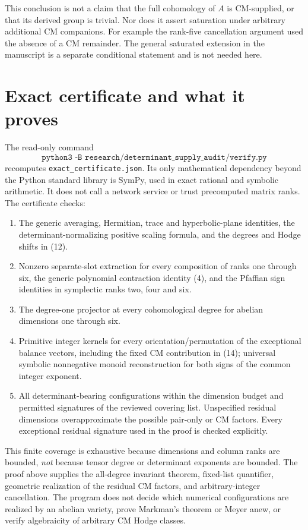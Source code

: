 \documentclass[11pt]{article}
\theoremstyle{remark}
\begin{document}
This conclusion is not a claim that the full cohomology of $A$ is
CM-supplied, or that its derived group is trivial. Nor does it assert
saturation under arbitrary additional CM companions. For example the
rank-five cancellation argument used the absence of a CM remainder.
The general saturated extension in the manuscript is a separate
conditional statement and is not needed here.

\section{Exact certificate and what it proves}

The read-only command
\[
 \texttt{python3 -B research/determinant\_supply\_audit/verify.py}
\]
recomputes \texttt{exact\_certificate.json}. Its only mathematical
dependency beyond the Python standard library is SymPy, used in exact
rational and symbolic arithmetic.
It does not call a network service or trust precomputed matrix ranks.
The certificate checks:
\begin{enumerate}
\item The generic averaging, Hermitian, trace and hyperbolic-plane
identities, the determinant-normalizing positive scaling formula,
and the degrees and Hodge shifts in (12).
\item Nonzero separate-slot extraction for every composition of ranks
one through six, the generic polynomial contraction identity (4),
and the Pfaffian sign identities in symplectic ranks two, four and six.
\item The degree-one projector at every cohomological degree for
abelian dimensions one through six.
\item Primitive integer kernels for every orientation/permutation of
the exceptional balance vectors, including the fixed CM contribution
in (14); universal symbolic nonnegative monoid reconstruction for
both signs of the common integer exponent.
\item All determinant-bearing configurations within the dimension
budget and permitted signatures of the reviewed covering list.
Unspecified residual dimensions overapproximate the possible
pair-only or CM factors. Every exceptional residual signature used
in the proof is checked explicitly.
\end{enumerate}
This finite coverage is exhaustive because dimensions and column ranks
are bounded, \emph{not} because tensor degree or determinant exponents
are bounded. The proof above supplies the all-degree invariant theorem,
fixed-list quantifier, geometric realization of the residual CM factors,
and arbitrary-integer cancellation. The program does not decide which
numerical configurations are realized by an abelian variety, prove
Markman's theorem or Meyer anew, or verify algebraicity of arbitrary
CM Hodge classes.
\end{document}
